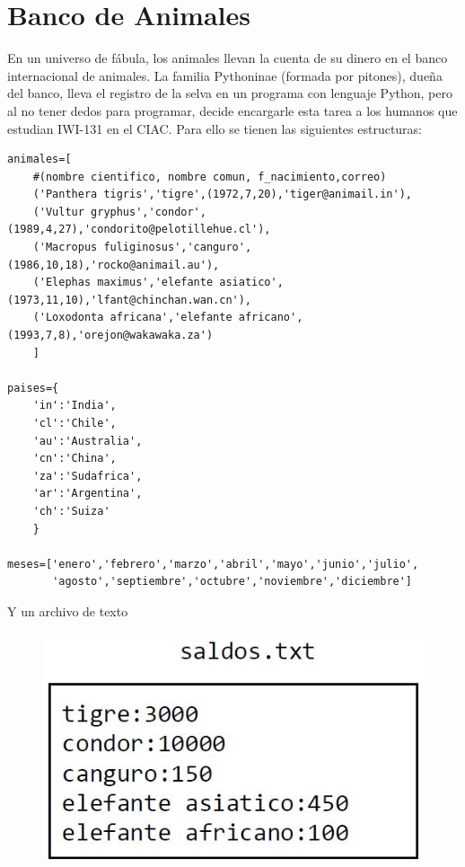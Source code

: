\section{Banco de Animales}
En un universo de fábula, los animales llevan la cuenta de su dinero en el banco internacional de animales. La familia Pythoninae (formada por pitones), dueña del banco, lleva el registro de la selva en un programa con lenguaje Python, pero al no tener dedos para programar, decide encargarle esta tarea a los humanos que estudian IWI-131 en el CIAC. Para ello se tienen las siguientes estructuras:

\begin{lstlisting}[style=consola]
animales=[
    #(nombre cientifico, nombre comun, f_nacimiento,correo)
    ('Panthera tigris','tigre',(1972,7,20),'tiger@animail.in'),
    ('Vultur gryphus','condor',(1989,4,27),'condorito@pelotillehue.cl'),
    ('Macropus fuliginosus','canguro',(1986,10,18),'rocko@animail.au'),
    ('Elephas maximus','elefante asiatico',(1973,11,10),'lfant@chinchan.wan.cn'),
    ('Loxodonta africana','elefante africano',(1993,7,8),'orejon@wakawaka.za')
    ]

paises={
    'in':'India',
    'cl':'Chile',
    'au':'Australia',
    'cn':'China',
    'za':'Sudafrica',
    'ar':'Argentina',
    'ch':'Suiza'
    }
    
meses=['enero','febrero','marzo','abril','mayo','junio','julio',
       'agosto','septiembre','octubre','noviembre','diciembre']

\end{lstlisting}

Y un archivo de texto
\begin{figure}[h]
    \centering
    \includegraphics[scale=0.6]{Imagenes/imagen4.jpg}
\end{figure}

